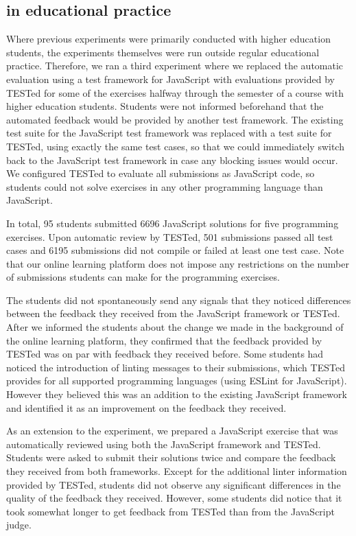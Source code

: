 \documentclass[../main]{subfiles}
\begin{document}
\subsection{\tested{} in educational practice}\label{subsec:tested-in-educational-practice}

Where previous experiments were primarily conducted with higher education students, the experiments themselves were run outside regular educational practice.
Therefore, we ran a third experiment where we replaced the automatic evaluation using a test framework for JavaScript with evaluations provided by TESTed for some of the exercises halfway through the semester of a course with higher education students.
Students were not informed beforehand that the automated feedback would be provided by another test framework.
The existing test suite for the JavaScript test framework was replaced with a test suite for TESTed, using exactly the same test cases, so that we could immediately switch back to the JavaScript test framework in case any blocking issues would occur.
We configured TESTed to evaluate all submissions as JavaScript code, so students could not solve exercises in any other programming language than JavaScript.

In total, \num{95} students submitted \num{6696} JavaScript solutions for five programming exercises.
Upon automatic review by TESTed, \num{501} submissions passed all test cases and \num{6195} submissions did not compile or failed at least one test case.
Note that our online learning platform does not impose any restrictions on the number of submissions students can make for the programming exercises.

The students did not spontaneously send any signals that they noticed differences between the feedback they received from the JavaScript framework or TESTed.
After we informed the students about the change we made in the background of the online learning platform, they confirmed that the feedback provided by TESTed was on par with feedback they received before.
Some students had noticed the introduction of linting messages to their submissions, which TESTed provides for all supported programming languages (using ESLint for JavaScript).
However they believed this was an addition to the existing JavaScript framework and identified it as an improvement on the feedback they received.

As an extension to the experiment, we prepared a JavaScript exercise that was automatically reviewed using both the JavaScript framework and TESTed.
Students were asked to submit their solutions twice and compare the feedback they received from both frameworks.
Except for the additional linter information provided by TESTed, students did not observe any significant differences in the quality of the feedback they received.
However, some students did notice that it took somewhat longer to get feedback from TESTed than from the JavaScript judge.
\end{document}
